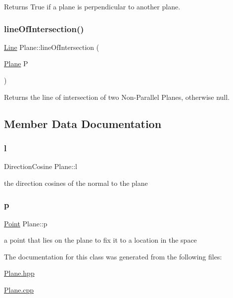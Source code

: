 Returns True if a plane is perpendicular to another plane. 

\mbox{\label{class_plane_a04a259828a74830947a30834885b9240}} 
\subsubsection{\texorpdfstring{line\+Of\+Intersection()}{lineOfIntersection()}}
{\footnotesize\ttfamily \mbox{\hyperlink{class_line}{Line}} Plane\+::line\+Of\+Intersection (\begin{DoxyParamCaption}\item[{\mbox{\hyperlink{class_plane}{Plane}}}]{P }\end{DoxyParamCaption})}



Returns the line of intersection of two Non-\/\+Parallel Planes, otherwise null. 



\subsection{Member Data Documentation}
\mbox{\label{class_plane_aafdc7fc15019da566e4cdf760f1eaf17}} 
\subsubsection{\texorpdfstring{l}{l}}
{\footnotesize\ttfamily Direction\+Cosine Plane\+::l}



the direction cosines of the normal to the plane 

\mbox{\label{class_plane_ad289dccce2529d46275e4fb6878a8625}} 
\subsubsection{\texorpdfstring{p}{p}}
{\footnotesize\ttfamily \mbox{\hyperlink{class_point}{Point}} Plane\+::p}



a point that lies on the plane to fix it to a location in the space 



The documentation for this class was generated from the following files\+:\begin{DoxyCompactItemize}
\item 
\mbox{\hyperlink{_plane_8hpp}{Plane.\+hpp}}\item 
\mbox{\hyperlink{_plane_8cpp}{Plane.\+cpp}}\end{DoxyCompactItemize}
